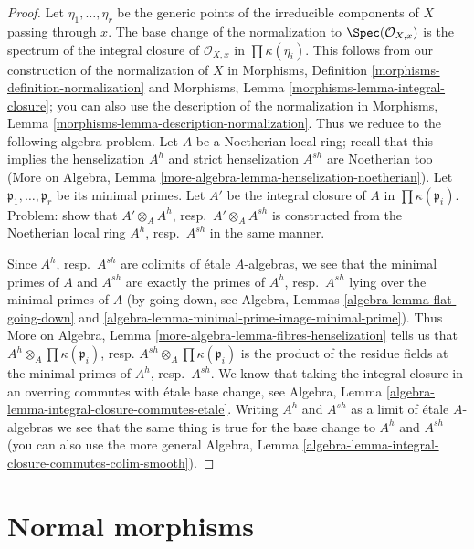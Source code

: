 \begin{proof}
Let $\eta_1, \ldots, \eta_r$ be the generic points of the irreducible
components of $X$ passing through $x$. The base change of the normalization to
$\Spec(\mathcal{O}_{X, x})$ is the spectrum of the
integral closure of $\mathcal{O}_{X, x}$ in $\prod \kappa(\eta_i)$.
This follows from our construction of the normalization of $X$ in
Morphisms, Definition \ref{morphisms-definition-normalization}
and Morphisms, Lemma \ref{morphisms-lemma-integral-closure};
you can also use the description of the normalization
in Morphisms, Lemma \ref{morphisms-lemma-description-normalization}.
Thus we reduce to the following algebra problem.
Let $A$ be a Noetherian local ring; recall that this implies
the henselization $A^h$ and strict henselization $A^{sh}$
are Noetherian too (More on Algebra, Lemma
\ref{more-algebra-lemma-henselization-noetherian}).
Let $\mathfrak p_1, \ldots, \mathfrak p_r$
be its minimal primes. Let $A'$ be the integral closure
of $A$ in $\prod \kappa(\mathfrak p_i)$.
Problem: show that
$A' \otimes_A A^h$, resp.\ $A' \otimes_A A^{sh}$ is constructed
from the Noetherian local ring $A^h$, resp.\ $A^{sh}$ in the same
manner.

\medskip\noindent
Since $A^h$, resp.\ $A^{sh}$ are colimits of \'etale $A$-algebras,
we see that the minimal primes of $A$ and $A^{sh}$ are exactly
the primes of $A^h$, resp.\ $A^{sh}$ lying over the minimal primes
of $A$ (by going down, see
Algebra, Lemmas \ref{algebra-lemma-flat-going-down} and
\ref{algebra-lemma-minimal-prime-image-minimal-prime}).
Thus More on Algebra, Lemma \ref{more-algebra-lemma-fibres-henselization}
tells us that
$A^h \otimes_A \prod \kappa(\mathfrak p_i)$,
resp.
$A^{sh} \otimes_A \prod \kappa(\mathfrak p_i)$
is the product of the residue fields at the minimal primes
of $A^h$, resp.\ $A^{sh}$. We know that taking the
integral closure in an overring commutes with \'etale
base change, see
Algebra, Lemma \ref{algebra-lemma-integral-closure-commutes-etale}.
Writing $A^h$ and $A^{sh}$ as a limit of \'etale $A$-algebras
we see that the same thing is true for the base change to
$A^h$ and $A^{sh}$ (you can also use the more general
Algebra, Lemma \ref{algebra-lemma-integral-closure-commutes-colim-smooth}).
\end{proof}








\section{Normal morphisms}
\label{section-normal}

